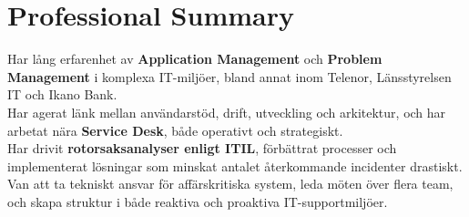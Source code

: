 



\section{Professional Summary}

Har lång erfarenhet av \textbf{Application Management} och \textbf{Problem Management} i komplexa IT-miljöer, bland annat inom Telenor, Länsstyrelsen IT och Ikano Bank. \\
Har agerat länk mellan användarstöd, drift, utveckling och arkitektur, och har arbetat nära \textbf{Service Desk}, både operativt och strategiskt. \\
Har drivit \textbf{rotorsaksanalyser enligt ITIL}, förbättrat processer och implementerat lösningar som minskat antalet återkommande incidenter drastiskt. \\
Van att ta tekniskt ansvar för affärskritiska system, leda möten över flera team, och skapa struktur i både reaktiva och proaktiva IT-supportmiljöer.
